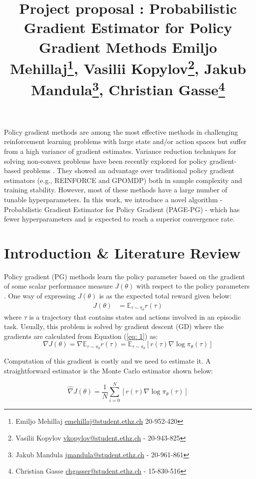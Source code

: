 \documentclass[10pt,twocolumn,letterpaper]{article}
\title{
		\usefont{OT1}{bch}{b}{n}
		\begin{flushleft}
		    \vspace{-0.5em}

		    \large {Project proposal : Probabilistic Gradient Estimator for Policy Gradient Methods \vspace{0em}}\newline
    		\scriptsize {\normalfont
    		{Emiljo Mehillaj\footnote{Emiljo Mehillaj \url{emehillaj@student.ethz.ch} 20-952-420}}, 
    		{Vasilii Kopylov\footnote{Vasilii Kopylov \url{vkopylov@student.ethz.ch} - 20-943-825}}, 
    		{Jakub Mandula\footnote{Jakub Mandula \url{jmandula@student.ethz.ch} - 20-961-861}}, 
    		{Christian Gasse\footnote{Christian Gasse \url{chgasser@student.ethz.ch} - 15-830-516}}}
    
    		\vspace{-6em}
		\end{flushleft}

}
\date{}
\begin{document}
\maketitle
{}


Policy gradient methods are among the most effective methods in challenging reinforcement learning problems with large state and/or action spaces but suffer from a high variance of gradient estimates. Variance reduction techniques for solving non-convex problems have been recently explored for policy gradient-based problems \cite{RN1,papini2018stochastic}. They showed an advantage over traditional policy gradient estimators (e.g., REINFORCE\cite{reinforcer} and GPOMDP\cite{RN14}) both in sample complexity and training stability. However, most of these methods have a large number of tunable hyperparameters. In this work, we introduce a novel algorithm - Probabilistic Gradient Estimator for Policy Gradient (PAGE-PG) - which has fewer hyperparameters and is expected to reach a superior convergence rate. 

\section{Introduction \& Literature Review}
Policy gradient (PG) methods learn the policy parameter based on the gradient of some scalar performance measure $J(\theta)$ with respect to the policy parameters \cite{sutton2018reinforcement}. One way of expressing $J(\theta)$ is as the expected total reward given below: 
\begin{equation} \label{eq: 1}
\begin{aligned}
J(\theta)
&=\mathbb{E}_{\tau \sim \pi_{\theta}} r(\tau)
\end{aligned}
\end{equation}
where $ \tau $ is a trajectory that contains states and actions involved in an episodic task.
Usually, this problem is solved by gradient descent (GD) where the gradients are calculated from Equation (\ref{eq: 1}) as:
\begin{equation} \label{eq: 2}
\nabla J(\theta)=\nabla \mathbb{E}_{\tau \sim \pi_{\theta}} r(\tau)=\mathbb{E}_{\tau \sim \pi_{\theta}}\left[r(\tau) \nabla \log \pi_{\theta}(\tau)\right]
\end{equation}

Computation of this gradient is costly and we need to estimate it. A straightforward  estimator is the Monte Carlo estimator shown below:

\begin{equation} \label{eq: 3}
\hat{\nabla} J(\theta)=\frac{1}{N} \sum_{i=0}^{N}\left[r(\tau) \nabla \log \pi_{\theta}(\tau)\right]
\end{equation}
\end{document}
